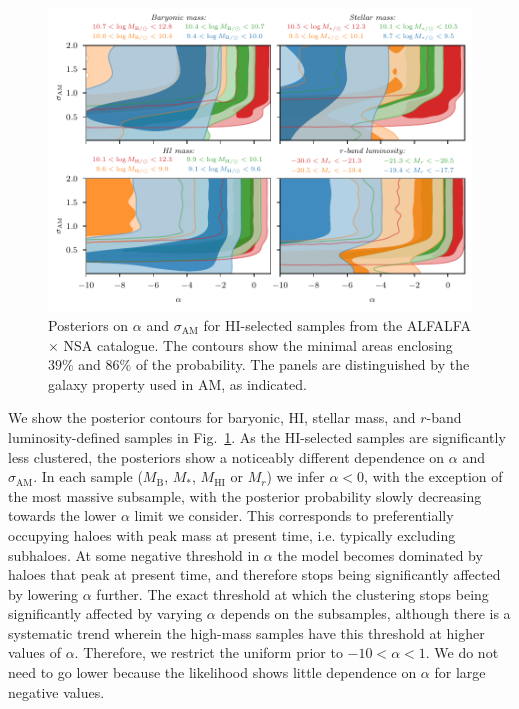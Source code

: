 \documentclass[usenatbib,useAMS]{mnras}
\newcommand{\HI}{\ensuremath{\mathrm{H}\scriptstyle\mathrm{I}}}
\newcommand{\scatter}{\ensuremath{\sigma_{\mathrm{AM}}}}
\newcommand{\matched}{ALFALFA $\times$ NSA }
\begin{document}
\begin{figure}
    \centering
    \includegraphics[width=1.0\textwidth]{Figures/HI_posteriors.pdf}
    \caption{Posteriors on $\alpha$ and $\scatter$ for $\HI$-selected samples from the \matched catalogue. The contours show the minimal areas enclosing $39\%$ and $86\%$ of the probability. The panels are distinguished by the galaxy property used in AM, as indicated.}
    \label{fig:HI_posteriors}
\end{figure}

We show the posterior contours for baryonic, $\HI$, stellar mass, and $r$-band luminosity-defined samples in Fig.~\ref{fig:HI_posteriors}. As the $\HI$-selected samples are significantly less clustered, the posteriors show a noticeably different dependence on $\alpha$ and $\scatter$. 
In each sample ($M_{\mathrm{B}}$, $M_*$, $M_{\HI}$ or $M_r$) we infer $\alpha < 0$, with the exception of the most massive subsample, with the posterior probability slowly decreasing towards the lower $\alpha$ limit we consider. This corresponds to preferentially occupying haloes with peak mass at present time, i.e. typically excluding subhaloes. At some negative threshold in $\alpha$ the model becomes dominated by haloes that peak at present time, and therefore stops being significantly affected by lowering $\alpha$ further. The exact threshold at which the clustering stops being significantly affected by varying $\alpha$ depends on the subsamples, although there is a systematic trend wherein the high-mass samples have this threshold at higher values of $\alpha$. Therefore, we restrict the uniform prior to $-10 < \alpha < 1$. We do not need to go lower because the likelihood shows little dependence on $\alpha$ for large negative values.
\end{document}
